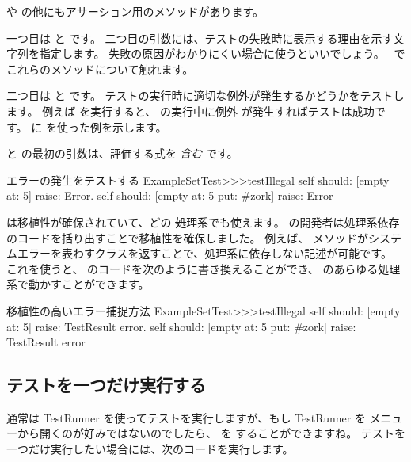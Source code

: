 \documentclass[a4paper,10pt,twoside]{book}
\begin{document}
 や  の他にもアサーション用のメソッドがあります。

一つ目は  と  です。
二つ目の引数には、テストの失敗時に表示する理由を示す文字列を指定します。
失敗の原因がわかりにくい場合に使うといいでしょう。
~でこれらのメソッドについて触れます。

二つ目は  と  です。
テストの実行時に適切な例外が発生するかどうかをテストします。
例えば  を実行すると、  の実行中に例外  が発生すればテストは成功です。
 に \mbox{} を使った例を示します。


 と  の最初の引数は、評価する式を \emph{含む}  です。

\begin{method}[ESTtestIllegal]{エラーの発生をテストする}
ExampleSetTest>>>testIllegal
	self should: [empty at: 5] raise: Error.
	self should: [empty at: 5 put: #zork] raise: Error
\end{method}

\sunit は移植性が確保されていて、どの \st 処理系でも使えます。
\sunit の開発者は処理系依存のコードを括り出すことで移植性を確保しました。
例えば、  メソッドがシステムエラーを表わすクラスを返すことで、処理系に依存しない記述が可能です。
これを使うと、  のコードを次のように書き換えることができ、 \st のあらゆる処理系で動かすことができます。

\begin{method}[portabletestillegal]{移植性の高いエラー捕捉方法}
ExampleSetTest>>>testIllegal
	self should: [empty at: 5] raise: TestResult error.
	self should: [empty at: 5 put: #zork] raise: TestResult error
\end{method}


\subsection{テストを一つだけ実行する}

通常は TestRunner を使ってテストを実行しますが、もし TestRunner を  メニューから開くのが好みではないのでしたら、  を  することができますね。
テストを一つだけ実行したい場合には、次のコードを実行します。
\end{document}
